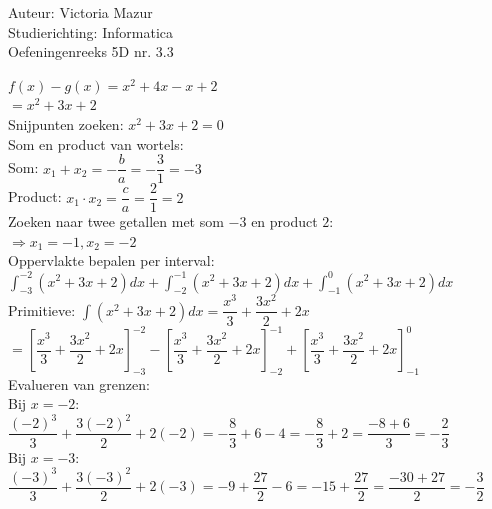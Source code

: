 \documentclass[a4paper]{article}
\begin{document}
  
\noindent \large Auteur: Victoria Mazur \\
\noindent \large Studierichting: Informatica\\
\noindent \large Oefeningenreeks 5D nr. 3.3\\

\medskip

\normalsize

$f(x) - g(x) = x^2 + 4x - x + 2$ \\

$= x^2 + 3x + 2$ \\

Snijpunten zoeken: $x^2 + 3x + 2 = 0$ \\

Som en product van wortels: \\

Som: $x_1 + x_2 = -\dfrac{b}{a} = -\dfrac{3}{1} = -3$ \\

Product: $x_1 \cdot x_2 = \dfrac{c}{a} = \dfrac{2}{1} = 2$ \\

Zoeken naar twee getallen met som $-3$ en product $2$: \\

$\Rightarrow x_1 = -1, x_2 = -2$ \\

Oppervlakte bepalen per interval: \\

$\displaystyle\int_{-3}^{-2} (x^2 + 3x + 2)dx + \displaystyle\int_{-2}^{-1} (x^2 + 3x + 2)dx + \displaystyle\int_{-1}^{0} (x^2 + 3x + 2)dx$ \\

Primitieve: $\displaystyle\int (x^2 + 3x + 2)dx = \dfrac{x^3}{3} + \dfrac{3x^2}{2} + 2x$ \\

$= \left[ \dfrac{x^3}{3} + \dfrac{3x^2}{2} + 2x \right]_{-3}^{-2} - \left[ \dfrac{x^3}{3} + \dfrac{3x^2}{2} + 2x \right]_{-2}^{-1} + \left[ \dfrac{x^3}{3} + \dfrac{3x^2}{2} + 2x \right]_{-1}^{0}$ \\

Evalueren van grenzen: \\

Bij $x = -2$: $\dfrac{(-2)^3}{3} + \dfrac{3(-2)^2}{2} + 2(-2) = -\dfrac{8}{3} + 6 - 4 = -\dfrac{8}{3} + 2 = \dfrac{-8+6}{3} = -\dfrac{2}{3}$ \\

Bij $x = -3$: $\dfrac{(-3)^3}{3} + \dfrac{3(-3)^2}{2} + 2(-3) = -9 + \dfrac{27}{2} - 6 = -15 + \dfrac{27}{2} = \dfrac{-30+27}{2} = -\dfrac{3}{2}$ \\
\end{document}
